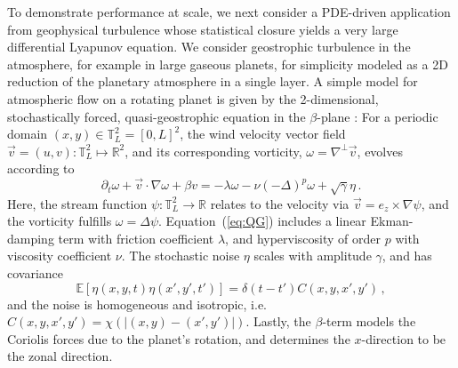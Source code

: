 \documentclass[12pt]{article}
\newcommand{\RR}{\mathds{R}}
\newcommand{\TT}{\mathds{T}}
\begin{document}
To demonstrate performance at scale, we next consider a PDE-driven application from geophysical turbulence whose statistical closure yields a very large differential Lyapunov equation. We consider geostrophic turbulence in the atmosphere, for example in large gaseous planets, for simplicity modeled as a 2D reduction of the planetary atmosphere in a single layer. A simple model for atmospheric flow on a rotating planet is given by the 2-dimensional, stochastically forced, quasi-geostrophic equation in the $\beta$-plane \cite{quasi_beta}: For a periodic domain $(x,y)\in\TT^2_L = [0,L]^2$, the wind velocity vector field $\vec{v}=(u,v): \TT^2_L \mapsto \RR^2$, and its corresponding vorticity, $\omega = \nabla^\perp \vec{v}$, evolves according to
\begin{equation}
  \label{eq:QG}
  \partial_t \omega +\vec{v}\cdot\nabla \omega + \beta v = -\lambda
  \omega -\nu (-\Delta )^p\omega + \sqrt{\gamma}\eta\,.
\end{equation}
Here, the stream function $\psi:\TT^2_L\to\RR$ relates to the velocity via
$\vec v = e_z\times \nabla \psi$, and the vorticity fulfills $\omega = \Delta \psi$. Equation~(\ref{eq:QG})  includes a linear Ekman-damping term with friction coefficient $\lambda$,
and hyperviscosity of order $p$ with viscosity coefficient $\nu$. The
stochastic noise $\eta$ scales with amplitude $\gamma$, and has
covariance
\begin{equation}
  {\mathbb{E}}[\eta(x,y,t)\eta(x',y',t')] = \delta(t-t') C(x, y, x', y')\,,
\end{equation}
and the noise is homogeneous and isotropic, i.e.~$C(x, y, x', y')=\chi(|(x,y)-(x',y')|)$. Lastly, the $\beta$-term
models the Coriolis forces due to the planet's rotation, and determines the
$x$-direction to be the zonal direction. 
\end{document}
